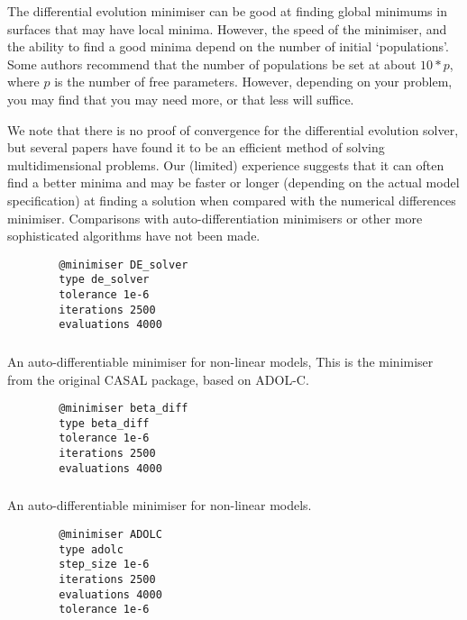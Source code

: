 The differential evolution minimiser can be good at finding global minimums in surfaces that may have local minima. However, the speed of the minimiser, and the ability to find a good minima depend on the number of initial `populations'. Some authors recommend that the number of populations be set at about $10*p$, where $p$ is the number of free parameters. However, depending on your problem, you may find that you may need more, or that less will suffice.

We note that there is no proof of convergence for the differential evolution solver, but several papers have found it to be an efficient method of solving multidimensional problems. Our (limited) experience suggests that it can often find a better minima and may be faster or longer (depending on the actual model specification) at finding a solution when compared with the numerical differences minimiser. Comparisons with auto-differentiation minimisers or other more sophisticated algorithms have not been made.

{\small{\begin{verbatim}
		@minimiser DE_solver
		type de_solver
		tolerance 1e-6
		iterations 2500
		evaluations 4000
		\end{verbatim}}}

\subsubsection{}

An auto-differentiable minimiser for non-linear models, This is the minimiser from the original CASAL package, based on ADOL-C.
{\small{\begin{verbatim}
		@minimiser beta_diff
		type beta_diff
		tolerance 1e-6
		iterations 2500
		evaluations 4000
		\end{verbatim}}}

\subsubsection{}

An auto-differentiable minimiser for non-linear models.

{\small{\begin{verbatim}
		@minimiser ADOLC
		type adolc
		step_size 1e-6
		iterations 2500
		evaluations 4000
		tolerance 1e-6
		\end{verbatim}}}

\subsubsection{}

